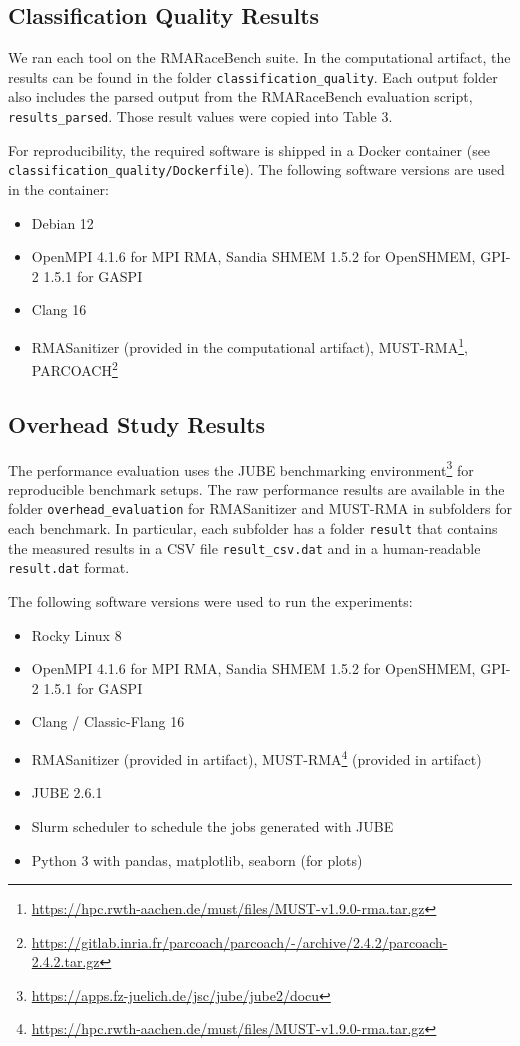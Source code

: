 \documentclass[twoside]{article}
\begin{document}
\subsection*{Classification Quality Results}
We ran each tool on the RMARaceBench suite. 
In the computational artifact, the results can be found in the folder \texttt{classification\_quality}.
Each output folder also includes the parsed output from the RMARaceBench evaluation script, \texttt{results\_parsed}.
Those result values were copied into Table 3.

For reproducibility, the required software is shipped in a Docker container (see \texttt{classification\_quality/Dockerfile}). The following software versions are used in the container:
\begin{itemize}
\item Debian 12
\item OpenMPI 4.1.6 for MPI RMA, Sandia SHMEM 1.5.2 for OpenSHMEM, GPI-2 1.5.1 for GASPI
\item Clang 16
\item RMASanitizer (provided in the computational artifact), MUST-RMA\footnote{\url{https://hpc.rwth-aachen.de/must/files/MUST-v1.9.0-rma.tar.gz}}, PARCOACH\footnote{\url{https://gitlab.inria.fr/parcoach/parcoach/-/archive/2.4.2/parcoach-2.4.2.tar.gz}}
\end{itemize}


\subsection*{Overhead Study Results}
The performance evaluation uses the JUBE benchmarking environment\footnote{\url{https://apps.fz-juelich.de/jsc/jube/jube2/docu}} for reproducible benchmark setups.
The raw performance results are available in the folder \texttt{overhead\_evaluation} for RMASanitizer and MUST-RMA in subfolders for each benchmark. In particular, each subfolder has a folder  \texttt{result} that contains the measured results in a CSV file \texttt{result\_csv.dat} and in a human-readable \texttt{result.dat} format.

The following software versions were used to run the experiments:
\begin{itemize}
\item Rocky Linux 8
\item OpenMPI 4.1.6 for MPI RMA, Sandia SHMEM 1.5.2 for OpenSHMEM, GPI-2 1.5.1 for GASPI
\item Clang / Classic-Flang 16
\item RMASanitizer (provided in artifact), MUST-RMA\footnote{\url{https://hpc.rwth-aachen.de/must/files/MUST-v1.9.0-rma.tar.gz}} (provided in artifact)
\item JUBE 2.6.1
\item Slurm scheduler to schedule the jobs generated with JUBE
\item Python 3 with pandas, matplotlib, seaborn (for plots)
\end{itemize}
\end{document}
